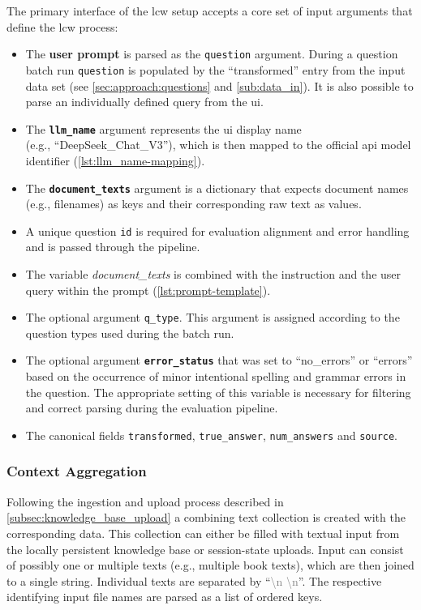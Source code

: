 The primary interface of the \ac{lcw} setup accepts a core set of input arguments that define the \ac{lcw} process:
\begin{itemize}
    \item  The \textbf{user prompt} is parsed as the \texttt{question} argument.
    During a question batch run \texttt{question} is populated by the \enquote{transformed} entry from the input data set (see \cref{sec:approach:questions} and \cref{sub:data_in}).
    It is also possible to parse an individually defined query from the \ac{ui}.
    \item The \textbf{\texttt{llm\_name}} argument represents the \ac{ui} display name\\ (e.g., \enquote{DeepSeek\_Chat\_V3}), which is then mapped to the official \ac{api} model identifier (\cref{lst:llm_name-mapping}).
    \item The \textbf{\texttt{document\_texts}} argument is a dictionary that expects document names (e.g., filenames) as keys and their corresponding raw text as values.
    \item A unique question \texttt{id} is required for evaluation alignment and error handling and is passed through the pipeline.
    \item The variable \textit{document\_texts} is combined with the instruction and the user query within the prompt (\cref{lst:prompt-template}).
    \item The optional argument \texttt{q\_type}. This argument is assigned according to the question types used during the batch run.
    \item The optional argument \textbf{\texttt{error\_status}} that was set to \enquote{no\_errors} or \enquote{errors} based on the occurrence of minor intentional spelling and grammar errors in the question.
    The appropriate setting of this variable is necessary for filtering and correct parsing during the evaluation pipeline.
    \item The canonical fields \texttt{transformed}, \texttt{true\_answer}, \texttt{num\_answers} and \texttt{source}.
\end{itemize}
%
\subsubsection{Context Aggregation}

Following the ingestion and upload process described in \cref{subsec:knowledge_base_upload} a combining text collection is created with the corresponding data.
This collection can either be filled with textual input from the locally persistent knowledge base or session-state uploads.
Input can consist of possibly one or multiple texts (e.g., multiple book texts), which are then joined to a single string.
Individual texts are separated by \enquote{\textcolor{gray}{\textbackslash n \textbackslash n}}.
The respective identifying input file names are parsed as a list of ordered keys.
%
